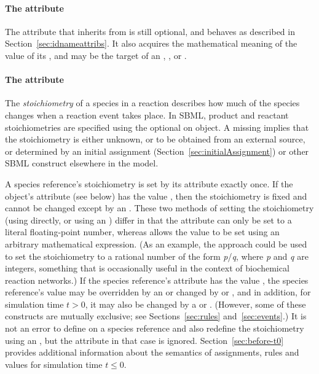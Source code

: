 \begin{blockChanged}
\paragraph{The  attribute}

The  attribute that \SpeciesReference inherits from \SBase is still optional, and behaves as described in Section~\ref{sec:idnameattribs}.  It also acquires the mathematical meaning of the value of its , and may be the target of an \InitialAssignment, \EventAssignment, or \Rule.
\end{blockChanged}

\paragraph{The  attribute}

The {\em stoichiometry} of a species in a reaction describes how
much of the species changes when a reaction event takes place.  In
SBML, product and reactant stoichiometries are specified using the
optional  on \SpeciesReference object.    A missing
 implies that the stoichiometry is either
unknown, or to be obtained from an external source, or determined
by an initial assignment (Section~\ref{sec:initialAssignment}) or
other SBML construct elsewhere in the model.

A species reference's stoichiometry is set by its
 attribute exactly once.  If the
\SpeciesReference object's  attribute (see below)
has the value , then the stoichiometry is fixed and
cannot be changed except by an \InitialAssignment.  These two
methods of setting the stoichiometry (\ie using
 directly, or using an \InitialAssignment)
differ in that the  attribute can only be set
to a literal floating-point number, whereas \InitialAssignment
allows the value to be set using an arbitrary mathematical
expression.  (As an example, the approach could be used to set the
stoichiometry to a rational number of the form \emph{p}/\emph{q},
where \emph{p} and \emph{q} are integers, something that is
occasionally useful in the context of biochemical reaction
networks.)  If the species reference's  attribute
has the value , the species reference's value may be
overridden by an \InitialAssignment or changed by \AssignmentRule
or \AlgebraicRule, and in addition, for simulation time $t > 0$,
it may also be changed by a \RateRule or \Event.  (However,
some of these constructs are mutually exclusive; see
Sections~\ref{sec:rules} and~\ref{sec:events}.)  It is not an
error to define  on a species reference and
also redefine the stoichiometry using an \InitialAssignment, but
the  attribute in that case is ignored.
Section~\ref{sec:before-t0} provides additional information about
the semantics of assignments, rules and values for simulation time
$t \leq 0$.


